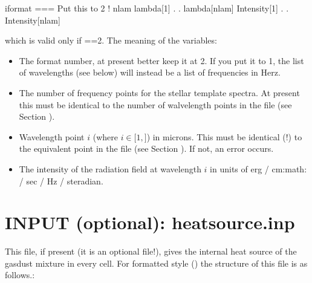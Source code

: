 \documentclass[letterpaper,10pt,english]{sphinxmanual}
\begin{document}
\begin{sphinxVerbatim}[commandchars=\\\{\}]
iformat                           \PYGZlt{}=== Put this to 2 !
nlam
lambda[1]
  .
  .
lambda[nlam]
Intensity[1]
  .
  .
Intensity[nlam]
\end{sphinxVerbatim}

which is valid only if ==2. The meaning of the variables:
\begin{itemize}
\item {} 
 The format number, at present better keep it at 2.
If you put it to 1, the list of wavelengths (see below) will instead be
a list of frequencies in Herz.

\item {} 
 The number of frequency points for the stellar
template spectra. At present this must be identical to the number of
walvelength points in the file  (see
Section {\hyperref[\detokenize{inputoutputfiles:sec-wavelengths}]{}}).

\item {} 
 Wavelength point \(i\) (where \(i\in
[1,\)\(]\)) in microns. This must be identical (!) to the
equivalent point in the file  (see
Section {\hyperref[\detokenize{inputoutputfiles:sec-wavelengths}]{}}). If not, an error occurs.

\item {} 
 The intensity of the radiation field at
wavelength \(i\) in units of erg / cm:math: / sec / Hz / steradian.

\end{itemize}


\section{INPUT (optional): heatsource.inp}
\label{\detokenize{inputoutputfiles:input-optional-heatsource-inp}}\label{\detokenize{inputoutputfiles:sec-heatsource}}
This file, if present (it is an optional file!), gives the internal heat
source of the gas\sphinxhyphen{}dust mixture in every cell. For formatted style
() the structure of this file is as follows.:
\end{document}

